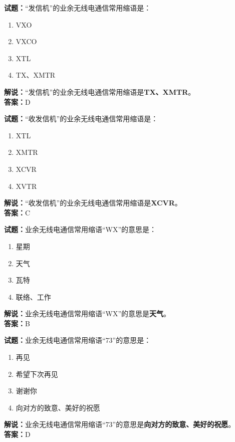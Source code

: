 \documentclass{ctexbook}
\begin{document}
\bigskip


\noindent\textbf{试题：}“发信机”的业余无线电通信常用缩语是：
\begin{enumerate}[leftmargin=3em]
\item VXO
\item VXCO
\item XTL
\item TX、XMTR
\end{enumerate}
\noindent\textbf{解说：}“发信机”的业余无线电通信常用缩语是\textbf{TX、XMTR}。\\\noindent\textbf{答案：}D



\bigskip


\noindent\textbf{试题：}“收发信机”的业余无线电通信常用缩语是：
\begin{enumerate}[leftmargin=3em]
\item XTL
\item XMTR
\item XCVR
\item XVTR
\end{enumerate}
\noindent\textbf{解说：}“收发信机”的业余无线电通信常用缩语是\textbf{XCVR}。\\\noindent\textbf{答案：}C





\bigskip


\noindent\textbf{试题：}业余无线电通信常用缩语“WX”的意思是：
\begin{enumerate}[leftmargin=3em]
\item 星期
\item 天气
\item 瓦特
\item 联络、工作
\end{enumerate}
\noindent\textbf{解说：}业余无线电通信常用缩语“WX”的意思是\textbf{天气}。\\\noindent\textbf{答案：}B


\bigskip


\noindent\textbf{试题：}业余无线电通信常用缩语“73”的意思是：
\begin{enumerate}[leftmargin=3em]
\item 再见
\item 希望下次再见
\item 谢谢你
\item 向对方的致意、美好的祝愿
\end{enumerate}
\noindent\textbf{解说：}业余无线电通信常用缩语“73”的意思是\textbf{向对方的致意、美好的祝愿}。\\\noindent\textbf{答案：}D
\end{document}
